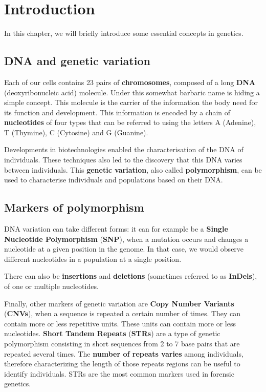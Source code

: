 \documentclass[
]{book}
\begin{document}
\hypertarget{introduction}{%
\chapter{Introduction}\label{introduction}}

In this chapter, we will briefly introduce some essential concepts in genetics.

\hypertarget{dna-and-genetic-variation}{%
\section*{DNA and genetic variation}\label{dna-and-genetic-variation}}

Each of our cells contains 23 pairs of \textbf{chromosomes}, composed of a long \textbf{DNA}
(deoxyribonucleic acid) molecule. Under this somewhat barbaric name
is hiding a simple concept. This molecule is the carrier of the information
the body need for its function and development. This information is encoded by a
chain of \textbf{nucleotides} of four types that can be referred to using the letters
A (Adenine), T (Thymine), C (Cytosine) and G (Guanine).

Developments in biotechnologies enabled the characterisation of the DNA of
individuals. These techniques also led to the discovery that this DNA varies
between individuals. This \textbf{genetic variation}, also called \textbf{polymorphism},
can be used to characterise individuals and populations based on their DNA.

\hypertarget{markers-of-polymorphism}{%
\section*{Markers of polymorphism}\label{markers-of-polymorphism}}

DNA variation can take different forms: it can for example be a
\textbf{Single Nucleotide Polymorphism} (\textbf{SNP}), when a mutation occurs and changes a
nucleotide at a given position in the genome. In that case, we would observe
different nucleotides in a population at a single position.

There can also be \textbf{insertions} and \textbf{deletions} (sometimes referred to as
\textbf{InDels}), of one or multiple nucleotides.

Finally, other markers of genetic variation are \textbf{Copy Number Variants} (\textbf{CNVs}),
when a sequence is repeated a certain number of times.
They can contain more or less repetitive units. These units can contain more or
less nucleotides. \textbf{Short Tandem Repeats} (\textbf{STRs}) are a type of genetic
polymorphism consisting in short sequences from 2 to 7 base pairs that are
repeated several times. The \textbf{number of repeats varies} among individuals, therefore characterizing
the length of those repeats regions can be useful to identify individuals. STRs are the most common markers used in forensic genetics.
\end{document}
